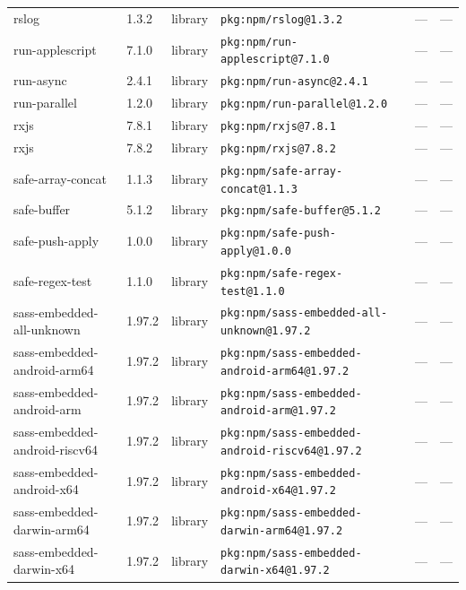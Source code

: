 \documentclass[11pt,a4paper]{article}
\begin{document}
\begin{longtable}{|p{4cm}|p{2cm}|p{1.6cm}|p{5cm}|p{1.5cm}|p{3.5cm}|}
\raggedright rslog & 1.3.2 & library & \small\texttt{pkg:npm/rslog@1.3.2} & — & \small — \\
\raggedright run-applescript & 7.1.0 & library & \small\texttt{pkg:npm/run-applescript@7.1.0} & — & \small — \\
\raggedright run-async & 2.4.1 & library & \small\texttt{pkg:npm/run-async@2.4.1} & — & \small — \\
\raggedright run-parallel & 1.2.0 & library & \small\texttt{pkg:npm/run-parallel@1.2.0} & — & \small — \\
\raggedright rxjs & 7.8.1 & library & \small\texttt{pkg:npm/rxjs@7.8.1} & — & \small — \\
\raggedright rxjs & 7.8.2 & library & \small\texttt{pkg:npm/rxjs@7.8.2} & — & \small — \\
\raggedright safe-array-concat & 1.1.3 & library & \small\texttt{pkg:npm/safe-array-concat@1.1.3} & — & \small — \\
\raggedright safe-buffer & 5.1.2 & library & \small\texttt{pkg:npm/safe-buffer@5.1.2} & — & \small — \\
\raggedright safe-push-apply & 1.0.0 & library & \small\texttt{pkg:npm/safe-push-apply@1.0.0} & — & \small — \\
\raggedright safe-regex-test & 1.1.0 & library & \small\texttt{pkg:npm/safe-regex-test@1.1.0} & — & \small — \\
\raggedright sass-embedded-all-unknown & 1.97.2 & library & \small\texttt{pkg:npm/sass-embedded-all-unknown@1.97.2} & — & \small — \\
\raggedright sass-embedded-android-arm64 & 1.97.2 & library & \small\texttt{pkg:npm/sass-embedded-android-arm64@1.97.2} & — & \small — \\
\raggedright sass-embedded-android-arm & 1.97.2 & library & \small\texttt{pkg:npm/sass-embedded-android-arm@1.97.2} & — & \small — \\
\raggedright sass-embedded-android-riscv64 & 1.97.2 & library & \small\texttt{pkg:npm/sass-embedded-android-riscv64@1.97.2} & — & \small — \\
\raggedright sass-embedded-android-x64 & 1.97.2 & library & \small\texttt{pkg:npm/sass-embedded-android-x64@1.97.2} & — & \small — \\
\raggedright sass-embedded-darwin-arm64 & 1.97.2 & library & \small\texttt{pkg:npm/sass-embedded-darwin-arm64@1.97.2} & — & \small — \\
\raggedright sass-embedded-darwin-x64 & 1.97.2 & library & \small\texttt{pkg:npm/sass-embedded-darwin-x64@1.97.2} & — & \small — \\

\end{longtable}
\end{document}
